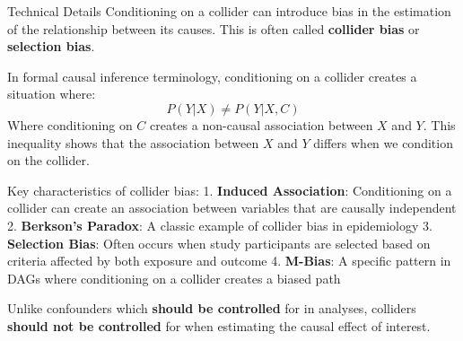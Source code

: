 \begin{frame}{Technical Details}
Conditioning on a collider can introduce bias in the estimation of the relationship between its causes. This is often called \textbf{collider bias} or \textbf{selection bias}.

In formal causal inference terminology, conditioning on a collider creates a situation where:
$$
P(Y|X) \neq P(Y|X, C)
$$
Where conditioning on $C$ creates a non-causal association between $X$ and $Y$. This inequality shows that the association between $X$ and $Y$ differs when we condition on the collider.

Key characteristics of collider bias:
1. \textbf{Induced Association}: Conditioning on a collider can create an association between variables that are causally independent
2. \textbf{Berkson's Paradox}: A classic example of collider bias in epidemiology
3. \textbf{Selection Bias}: Often occurs when study participants are selected based on criteria affected by both exposure and outcome
4. \textbf{M-Bias}: A specific pattern in DAGs where conditioning on a collider creates a biased path

Unlike confounders which \textbf{should be controlled} for in analyses, colliders \textbf{should not be controlled} for when estimating the causal effect of interest.
\end{frame}


